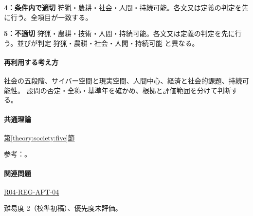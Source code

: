 \noindent\textbf{4：条件内で適切} 狩猟・農耕・社会・人間・持続可能。各文又は定義の判定を先に行う。全項目が一致する。\par

\noindent\textbf{5：不適切} 狩猟・農耕・技術・人間・持続可能。各文又は定義の判定を先に行う。並びが判定 狩猟・農耕・社会・人間・持続可能 と異なる。\par

\paragraph{再利用する考え方} 社会の五段階、サイバー空間と現実空間、人間中心、経済と社会的課題、持続可能性。 設問の否定・全称・基準年を確かめ、根拠と評価範囲を分けて判断する。

\paragraph{共通理論} \hyperref[theory:society:five]{第\ref*{theory:society:five}節}

\par 参考：\cite{eth54_society2021}。

\paragraph{関連問題} \hyperref[q:r04-reg-apt-04]{R04-REG-APT-04}

\par 難易度 2（校準初稿）、優先度未評価。
